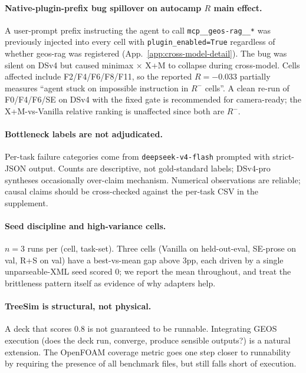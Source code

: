 \documentclass{article}
\begin{document}
\paragraph{Native-plugin-prefix bug spillover on autocamp $R$ main effect.}
A user-prompt prefix instructing the agent to call \texttt{mcp\_\_geos-rag\_\_*} was previously injected into every cell with \texttt{plugin\_enabled=True} regardless of whether geos-rag was registered (App.~\ref{app:cross-model-detail}). The bug was silent on DSv4 but caused minimax × X+M to collapse during cross-model. Cells affected include F2/F4/F6/F8/F11, so the reported $R = -0.033$ partially measures ``agent stuck on impossible instruction in $R^{-}$ cells''. A clean re-run of F0/F4/F6/SE on DSv4 with the fixed gate is recommended for camera-ready; the X+M-vs-Vanilla relative ranking is unaffected since both are $R^{-}$.

\paragraph{Bottleneck labels are not adjudicated.}
Per-task failure categories come from \texttt{deepseek-v4-flash} prompted with strict-JSON output. Counts are descriptive, not gold-standard labels; DSv4-pro syntheses occasionally over-claim mechanism. Numerical observations are reliable; causal claims should be cross-checked against the per-task CSV in the supplement.

\paragraph{Seed discipline and high-variance cells.}
$n=3$ runs per (cell, task-set). Three cells (Vanilla on held-out-eval, SE-prose on val, R+S on val) have a best-vs-mean gap above 3pp, each driven by a single unparseable-XML seed scored 0; we report the mean throughout, and treat the brittleness pattern itself as evidence of why adapters help.

\paragraph{TreeSim is structural, not physical.}
A deck that scores 0.8 is not guaranteed to be runnable. Integrating GEOS execution (does the deck run, converge, produce sensible outputs?) is a natural extension. The OpenFOAM coverage metric goes one step closer to runnability by requiring the presence of all benchmark files, but still falls short of execution.
\end{document}
